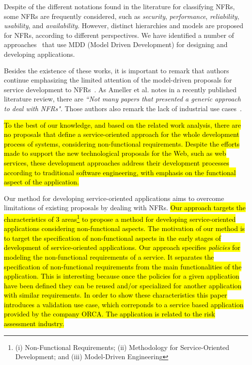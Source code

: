 \documentclass{singlecol-new}
\theoremstyle{TH}{
\newtheorem{lemma}{Lemma}
\newtheorem{theorem}[lemma]{Theorem}
\newtheorem{corrolary}[lemma]{Corrolary}
\newtheorem{conjecture}[lemma]{Conjecture}
\newtheorem{proposition}[lemma]{Proposition}
\newtheorem{claim}[lemma]{Claim}
\newtheorem{stheorem}[lemma]{Wrong Theorem}
\newtheorem{algorithm}{Algorithm}
}
\theoremstyle{THrm}{
\newtheorem{definition}{Definition}[section]
\newtheorem{question}{Question}[section]
\newtheorem{remark}{Remark}
\newtheorem{scheme}{Scheme}
}
\theoremstyle{THhit}{
\newtheorem{case}{Case}[section]
}
\theoremstyle{THhsl}{
\newtheorem{example}{Example}
}
\begin{document}
Despite of the different notations found in the literature for classifying NFRs, some NFRs are frequently considered, such as \textit{security}, \textit{performance}, \textit{reliability}, \textit{usability}, and \textit{availability}.
However, distinct hierarchies and models are proposed for NFRs, according to different perspectives.
We have identified a number of approaches~\cite{DAmbrogio06,CholletL09,SchmelingCM11,BasinDL06,Fabra2011,OvaskaEHPA10} that use MDD (Model Driven Development) for designing and developing applications.

Besides the existence of these works, it is important to remark that authors continue emphasizing the limited attention of the model-driven proposals for service development to NFRs~\cite{Ameller201542,Ameller2010}.%
As Ameller et al. notes in a recently published literature review, there are \textit{``Not many papers that presented a generic approach to deal with NFRs"}. Those authors also remark the lack of industrial use cases~\cite{Ameller201542}. 

\hl{
To the best of our knowledge, and based on the related work analysis, there are no proposals that define a service-oriented approach for the whole development process of systems, considering
non-functional requirements. Despite the efforts  made to support the new
technological proposals for the Web, such as web services,  these
development approaches address their development processes according to traditional software
engineering, with emphasis on the functional aspect of the
application.} 

Our method for developing service-oriented applications aims to overcome  limitations of existing  proposals by dealing with NFRs.  \hl{Our approach targets the characteristics of  3
areas\footnote{(i) Non-Functional Requirements; (ii) Methodology for Service-Oriented Development;
and (iii) Model-Driven Engineering} to propose a method for
developing service-oriented applications considering non-functional aspects.
The motivation of our method is to target the specification of non-functional aspects in the early stages of development of service-oriented  applications. Our approach specifies \textit{policies} for modeling the non-functional requirements of a service. It separates the specification of non-functional requirements from the main functionalities of the application. This is interesting because once the policies for a given application have been defined they can be reused and/or specialized for another application with similar requirements. In order to show these characteristics this paper introduces a validation use case, which correponds to  a service based application provided  by the company ORCA. The application is related to the risk assessment industry.
}
\end{document}
